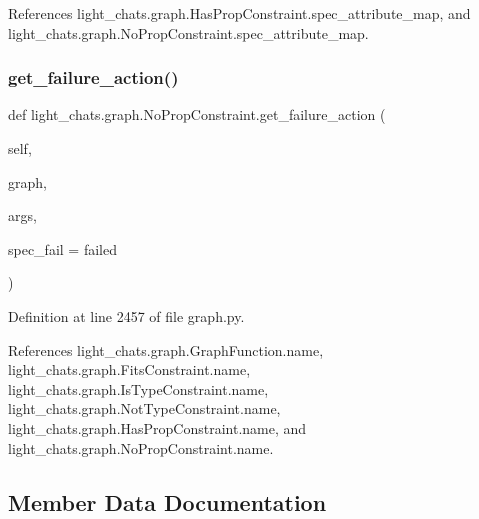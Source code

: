 References light\+\_\+chats.\+graph.\+Has\+Prop\+Constraint.\+spec\+\_\+attribute\+\_\+map, and light\+\_\+chats.\+graph.\+No\+Prop\+Constraint.\+spec\+\_\+attribute\+\_\+map.

\mbox{\label{classlight__chats_1_1graph_1_1NoPropConstraint_ad9fd1275af02f384bd55ceaebc6ee59c}} 
\subsubsection{\texorpdfstring{get\+\_\+failure\+\_\+action()}{get\_failure\_action()}}
{\footnotesize\ttfamily def light\+\_\+chats.\+graph.\+No\+Prop\+Constraint.\+get\+\_\+failure\+\_\+action (\begin{DoxyParamCaption}\item[{}]{self,  }\item[{}]{graph,  }\item[{}]{args,  }\item[{}]{spec\+\_\+fail = {\ttfamily \textquotesingle{}failed\textquotesingle{}} }\end{DoxyParamCaption})}



Definition at line 2457 of file graph.\+py.



References light\+\_\+chats.\+graph.\+Graph\+Function.\+name, light\+\_\+chats.\+graph.\+Fits\+Constraint.\+name, light\+\_\+chats.\+graph.\+Is\+Type\+Constraint.\+name, light\+\_\+chats.\+graph.\+Not\+Type\+Constraint.\+name, light\+\_\+chats.\+graph.\+Has\+Prop\+Constraint.\+name, and light\+\_\+chats.\+graph.\+No\+Prop\+Constraint.\+name.



\subsection{Member Data Documentation}
\mbox{\label{classlight__chats_1_1graph_1_1NoPropConstraint_a73cef897b375d0070ea5979c44e3b685}} 

